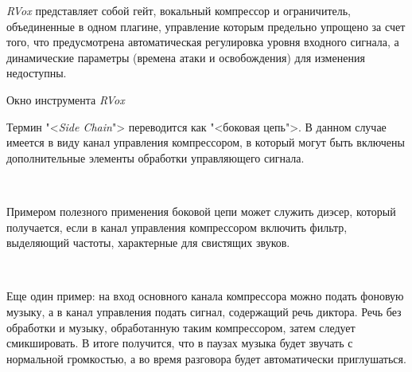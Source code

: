 \documentclass{beamer}
\begin{document}
\begin{frame}
  \emph{RVox} представляет собой гейт, вокальный компрессор и ограничитель, объединенные в одном плагине, управление которым предельно упрощено за счет того, что предусмотрена автоматическая регулировка уровня входного сигнала, а динамические параметры (времена атаки и освобождения) для изменения недоступны.

  \begin{block}{Окно инструмента \emph{RVox}}
  \end{block}
\end{frame} 

\begin{frame}
  Термин "<\emph{Side Chain}"> переводится как "<боковая цепь">. В данном случае имеется в виду канал управления компрессором, в который могут быть включены дополнительные элементы обработки управляющего сигнала.

  ~

  Примером полезного применения боковой цепи может служить диэсер, который получается, если в канал управления компрессором включить фильтр, выделяющий частоты, характерные для свистящих звуков. 
  
  ~
  
  Еще один пример: на вход основного канала компрессора можно подать фоновую музыку, а в канал управления подать сигнал, содержащий речь диктора. Речь без обработки и музыку, обработанную таким компрессором, затем следует смикшировать. В итоге получится, что в паузах музыка будет звучать с нормальной громкостью, а во время разговора будет автоматически приглушаться.
\end{frame}
\end{document}
